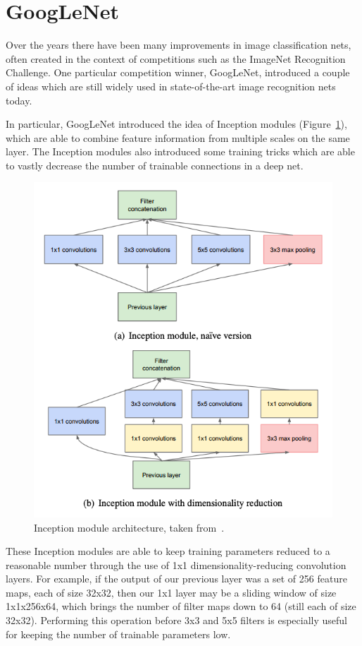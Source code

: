 \section{GoogLeNet}

Over the years there have been many improvements in image classification nets, often created in the context of competitions such as the ImageNet Recognition Challenge. One particular competition winner, GoogLeNet, introduced a couple of ideas which are still widely used in state-of-the-art image recognition nets today.

In particular, GoogLeNet introduced the idea of Inception modules (Figure~\ref{fig:inception}), which are able to combine feature information from multiple scales on the same layer. The Inception modules also introduced some training tricks which are able to vastly decrease the number of trainable connections in a deep net.

\begin{figure}[htbp]
    \centering
    \includegraphics[width=0.7\linewidth]{Images/ML/inception.png}
    \caption{Inception module architecture, taken from~\cite{GoogLeNet}.}
    \label{fig:inception}
\end{figure}

These Inception modules are able to keep training parameters reduced to a reasonable number through the use of 1x1 dimensionality-reducing convolution layers. For example, if the output of our previous layer was a set of 256 feature maps, each of size 32x32, then our 1x1 layer may be a sliding window of size 1x1x256x64, which brings the number of filter maps down to 64 (still each of size 32x32). Performing this operation before 3x3 and 5x5 filters is especially useful for keeping the number of trainable parameters low.

